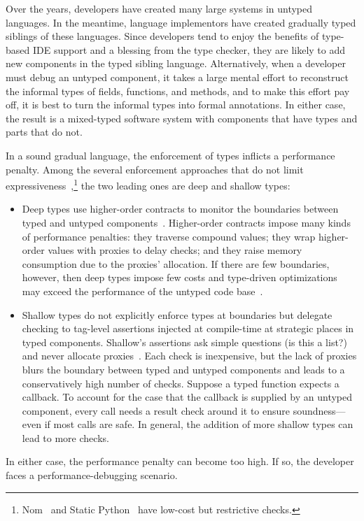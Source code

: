 
Over the years, developers have created many large systems in untyped languages.
In the meantime, language implementors have created gradually typed siblings of
these languages.  Since developers tend to enjoy the benefits of type-based IDE
support and a blessing from the type checker, they are likely to add new
components in the typed sibling language. Alternatively, when a developer must
debug an untyped component, it takes a large mental effort
to reconstruct the informal types of fields, functions, and methods, and to make
this effort pay off, it is best to turn the informal types into formal
annotations. In either case, the result is a mixed-typed software system
with components that have types and parts that do not.

In a sound gradual language, the enforcement of types inflicts a performance penalty.
Among the several enforcement approaches that do not limit
 expressiveness~\cite{type-untyped},\footnote{Nom~\cite{mt-oopsla-2017} and Static
Python~\cite{lgmvpk-pj-2023} have low-cost but restrictive
checks.} the two leading ones are deep and shallow types:
\begin{itemize}
  \item
    Deep types use higher-order contracts to monitor the
    boundaries between typed and untyped
    components~\cite{ff-icfp-2002,tf-dls-2006,st-sfp-2006}.  Higher-order
    contracts impose many kinds of performance penalties: they traverse
    compound values; they wrap higher-order values with proxies to delay
    checks; and they raise memory consumption due to the proxies'
    allocation.  If there are few boundaries, however, then deep types
    impose few costs and type-driven optimizations may exceed the
    performance of the untyped code base~\cite{gtnffvf-jfp-2019}.

  \item
    Shallow types do not explicitly enforce types at boundaries but
    delegate checking to tag-level assertions injected at
    compile-time at strategic places in typed components. Shallow's assertions
    ask simple questions (is this a list?) and never allocate
    proxies~\cite{vss-popl-2017, vksb-dls-2014}.  Each check is
    inexpensive, but the lack of proxies blurs the boundary between typed and
    untyped components and leads to a conservatively high number of checks.
    Suppose a typed function expects a callback.  To account for the case
    that the callback is supplied by an untyped component, every call needs a
    result check around it to ensure soundness---even if most calls are
    safe.  In general, the addition of more shallow types can lead to more
    checks.

\end{itemize}
In either case, the performance penalty can become too high.
If so, the developer faces a performance-debugging scenario.


